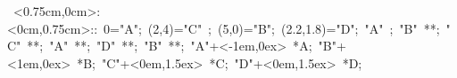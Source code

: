 \hbox{
\xy    <0.75cm,0cm>:<0cm,0.75cm>::
       0="A";     (2,4)="C" ; (5,0)="B";  (2.2,1.8)="D";   
       "A" ; "B" **\dir{-}; "C" **\dir{-}; 
       "A" **\dir{-}; "D" **\dir{-}; "B" **\dir{-}; 
       "A"+<-1em,0ex> *{A};
	   "B"+<1em,0ex> *{B};	 %
       "C"+<0em,1.5ex> *{C};
       "D"+<0em,1.5ex> *{D};     %
       \endxy}
